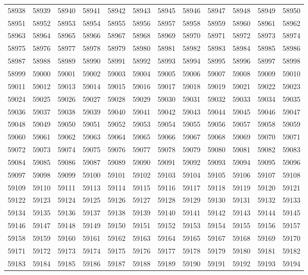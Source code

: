\begin{center}
\begin{longtable}{llllllllllll}
58938 &58939 &58940 &58941 &58942 &58943 &58945 &58946 &58947 &58948 &58949 &58950 \\
58951 &58952 &58953 &58954 &58955 &58956 &58957 &58958 &58959 &58960 &58961 &58962 \\
58963 &58964 &58965 &58966 &58967 &58968 &58969 &58970 &58971 &58972 &58973 &58974 \\
58975 &58976 &58977 &58978 &58979 &58980 &58981 &58982 &58983 &58984 &58985 &58986 \\
58987 &58988 &58989 &58990 &58991 &58992 &58993 &58994 &58995 &58996 &58997 &58998 \\
58999 &59000 &59001 &59002 &59003 &59004 &59005 &59006 &59007 &59008 &59009 &59010 \\
59011 &59012 &59013 &59014 &59015 &59016 &59017 &59018 &59019 &59021 &59022 &59023 \\
59024 &59025 &59026 &59027 &59028 &59029 &59030 &59031 &59032 &59033 &59034 &59035 \\
59036 &59037 &59038 &59039 &59040 &59041 &59042 &59043 &59044 &59045 &59046 &59047 \\
59048 &59049 &59050 &59051 &59052 &59053 &59054 &59055 &59056 &59057 &59058 &59059 \\
59060 &59061 &59062 &59063 &59064 &59065 &59066 &59067 &59068 &59069 &59070 &59071 \\
59072 &59073 &59074 &59075 &59076 &59077 &59078 &59079 &59080 &59081 &59082 &59083 \\
59084 &59085 &59086 &59087 &59089 &59090 &59091 &59092 &59093 &59094 &59095 &59096 \\
59097 &59098 &59099 &59100 &59101 &59102 &59103 &59104 &59105 &59106 &59107 &59108 \\
59109 &59110 &59111 &59113 &59114 &59115 &59116 &59117 &59118 &59119 &59120 &59121 \\
59122 &59123 &59124 &59125 &59126 &59127 &59128 &59129 &59130 &59131 &59132 &59133 \\
59134 &59135 &59136 &59137 &59138 &59139 &59140 &59141 &59142 &59143 &59144 &59145 \\
59146 &59147 &59148 &59149 &59150 &59151 &59152 &59153 &59154 &59155 &59156 &59157 \\
59158 &59159 &59160 &59161 &59162 &59163 &59164 &59165 &59167 &59168 &59169 &59170 \\
59171 &59172 &59173 &59174 &59175 &59176 &59177 &59178 &59179 &59180 &59181 &59182 \\
59183 &59184 &59185 &59186 &59187 &59188 &59189 &59190 &59191 &59192 &59193 &59194 \\

\end{longtable}
\end{center}
